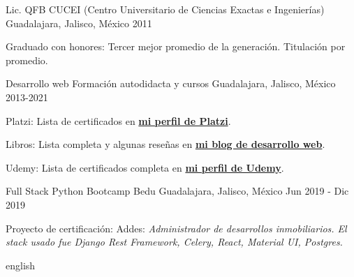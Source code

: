 {


\begin{cventries}
  \cventry
    {Lic. QFB}
    {CUCEI (Centro Universitario de Ciencias Exactas e Ingenierías)}
    {Guadalajara, Jalisco, México}
    {2011}
    {
      \begin{cvitems}
        \item {Graduado con honores: Tercer mejor promedio de la generación. Titulación por promedio.}
      \end{cvitems}
    }

    \cventry
    {Desarrollo web}
    {Formación autodidacta y cursos}
    {Guadalajara, Jalisco, México}
    {2013-2021}
    {
      \begin{cvitems}
        \item {Platzi: Lista de certificados en \color{gray} \textbf{\href{https://platzi.com/@eduardo-zepeda/}{mi perfil de Platzi}}.}
        \item {Libros: Lista completa y algunas reseñas en \color{gray} \textbf{ \href{https://coffeebytes.dev/libros-que-he-leido-y-resenas/}{mi blog de desarrollo web}}.}
        \item {Udemy: Lista de certificados completa en \color{gray} \textbf{\href{https://www.udemy.com/user/carlos-eduardo-magallon-zepeda/}{mi perfil de Udemy}}.}
      \end{cvitems}
    }

    \cventry
    {Full Stack Python Bootcamp}
    {Bedu}
    {Guadalajara, Jalisco, México}
    {Jun 2019 - Dic 2019}
    {
      \begin{cvitems}
        \item {Proyecto de certificación: Addes: \textit{Administrador de desarrollos inmobiliarios. El stack usado fue Django Rest Framework, Celery, React, Material UI, Postgres.}}
      \end{cvitems}
    }
\end{cventries}
}{english} 
